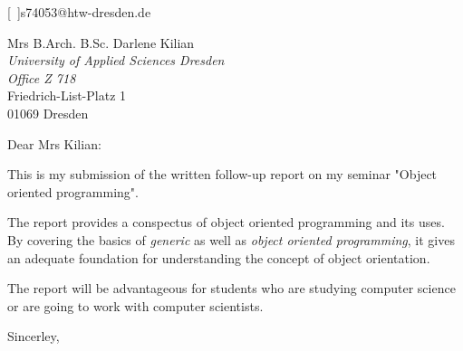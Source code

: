 
\renewcommand{\workingdir}{../../../}


\DNotiz{}
\DNoti{}
\renewcommand{\Dokumentensignatur}{}




[\Letter~]{s74053@htw-dresden.de}


\renewcommand*{\raggedsignature}{\raggedright}




\begin{letter}{
Mrs B.Arch. B.Sc. Darlene Kilian\\
\emph{University of Applied Sciences Dresden\\Office Z 718}\\
Friedrich-List-Platz 1\\
01069 Dresden
}

\opening{Dear Mrs Kilian:}

This is my submission of the written follow-up report on my seminar "Object oriented programming".\smallskip

The report provides a conspectus of object oriented programming and its uses. By covering the basics of \emph{generic} as well as \emph{object oriented programming}, it gives an adequate foundation for understanding the concept of object orientation.\smallskip

The report will be advantageous for students who are studying computer science or are going to work with computer scientists.

\closing{Sincerley,}
\end{letter}




